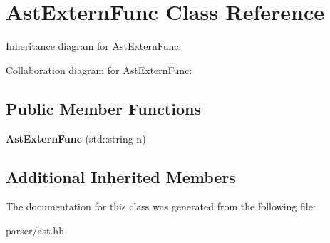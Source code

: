 \hypertarget{classAstExternFunc}{}\section{Ast\+Extern\+Func Class Reference}
\label{classAstExternFunc}


Inheritance diagram for Ast\+Extern\+Func\+:


Collaboration diagram for Ast\+Extern\+Func\+:
\subsection*{Public Member Functions}
\begin{DoxyCompactItemize}
\item 
\mbox{\label{classAstExternFunc_ac646b8240fe856e1136e3c5680c14f99}} 
{\bfseries Ast\+Extern\+Func} (std\+::string n)
\end{DoxyCompactItemize}
\subsection*{Additional Inherited Members}


The documentation for this class was generated from the following file\+:\begin{DoxyCompactItemize}
\item 
parser/ast.\+hh\end{DoxyCompactItemize}

